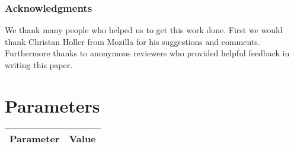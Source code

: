 \documentclass{acm_proc_article-sp}
\begin{document}
\subsubsection*{\textbf{Acknowledgments}} 
We thank many people who helped us to get this work done. First we would thank Christan Holler from Mozilla for his suggestions and comments. Furthermore thanks to anonymous reviewers who provided helpful feedback in writing this paper.




\appendix
\section{Parameters} \label{AppendixA}
\begin{tabular}{ l c }
Parameter & Value \\
\hline

\end{tabular}
\end{document}
